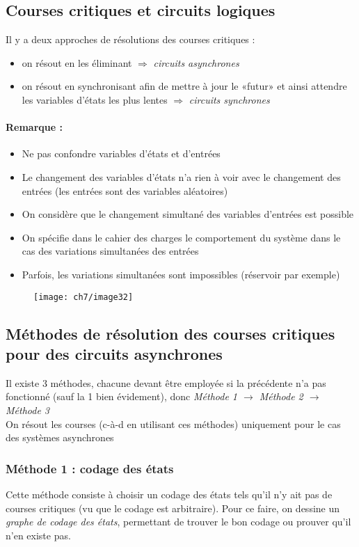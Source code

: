 \subsection{Courses critiques et circuits logiques}
Il y a deux approches de résolutions des courses critiques :
\begin{itemize}
	\item on résout en les éliminant $\Rightarrow$ \emph{circuits asynchrones}
	\item on résout en synchronisant afin de mettre à jour le «futur» et ainsi attendre les variables d'états les plus lentes $\Rightarrow$ \emph{circuits synchrones} 
\end{itemize}

\paragraph{Remarque :} 
\begin{itemize}
	\item Ne pas confondre variables d'états et d'entrées
	\item Le changement des variables d'états n'a rien à voir avec le changement des entrées (les entrées sont des variables aléatoires)
	\item On considère que le changement simultané des variables d'entrées est possible
	\item On spécifie dans le cahier des charges le comportement du système dans le cas des variations simultanées des entrées
	\item Parfois, les variations simultanées sont impossibles (réservoir par exemple)
\end{itemize}
\begin{figure}[H]
	\centering
	\texttt{[image: ch7/image32]}
\end{figure}
\subsection{Méthodes de résolution des courses critiques pour des circuits asynchrones}
\label{subsec:resolcrit}
Il existe 3 méthodes, chacune devant être employée si la précédente n'a pas fonctionné (sauf la 1 bien évidement), donc \emph{Méthode 1 $\rightarrow$ Méthode 2 $\rightarrow$ Méthode 3}\\
\danger On résout les courses (c-à-d en utilisant ces méthodes) uniquement pour le cas des systèmes asynchrones
\subsubsection{Méthode 1 : codage des états}
Cette méthode consiste à choisir un codage des états tels qu'il n'y ait pas de courses critiques (vu que le codage est arbitraire). Pour ce faire, on dessine un \emph{graphe de codage des états}, permettant de trouver le bon codage ou prouver qu'il n'en existe pas.
